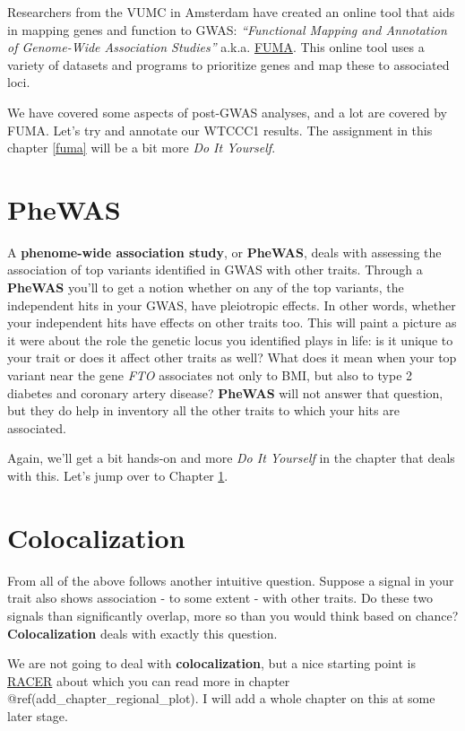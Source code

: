 \documentclass[
]{book}
\begin{document}
Researchers from the VUMC in Amsterdam have created an online tool that aids in mapping genes and function to GWAS: \emph{``Functional Mapping and Annotation of Genome-Wide Association Studies''} a.k.a. \href{https://fuma.ctglab.nl}{FUMA}. This online tool uses a variety of datasets and programs to prioritize genes and map these to associated loci.

We have covered some aspects of post-GWAS analyses, and a lot are covered by FUMA. Let's try and annotate our WTCCC1 results. The assignment in this chapter \ref{fuma} will be a bit more \emph{Do It Yourself}.

\hypertarget{phewas}{%
\section{PheWAS}\label{phewas}}

A \textbf{phenome-wide association study}, or \textbf{PheWAS}, deals with assessing the association of top variants identified in GWAS with other traits. Through a \textbf{PheWAS} you'll to get a notion whether on any of the top variants, the independent hits in your GWAS, have pleiotropic effects. In other words, whether your independent hits have effects on other traits too. This will paint a picture as it were about the role the genetic locus you identified plays in life: is it unique to your trait or does it affect other traits as well? What does it mean when your top variant near the gene \emph{FTO} associates not only to BMI, but also to type 2 diabetes and coronary artery disease? \textbf{PheWAS} will not answer that question, but they do help in inventory all the other traits to which your hits are associated.

Again, we'll get a bit hands-on and more \emph{Do It Yourself} in the chapter that deals with this. Let's jump over to Chapter \ref{phewas}.

\hypertarget{colocalization}{%
\section{Colocalization}\label{colocalization}}

From all of the above follows another intuitive question. Suppose a signal in your trait also shows association - to some extent - with other traits. Do these two signals than significantly overlap, more so than you would think based on chance? \textbf{Colocalization} deals with exactly this question.

We are not going to deal with \textbf{colocalization}, but a nice starting point is \href{https://github.com/oliviasabik/RACER}{RACER} about which you can read more in chapter @ref(add\_chapter\_regional\_plot). I will add a whole chapter on this at some later stage.
\end{document}
